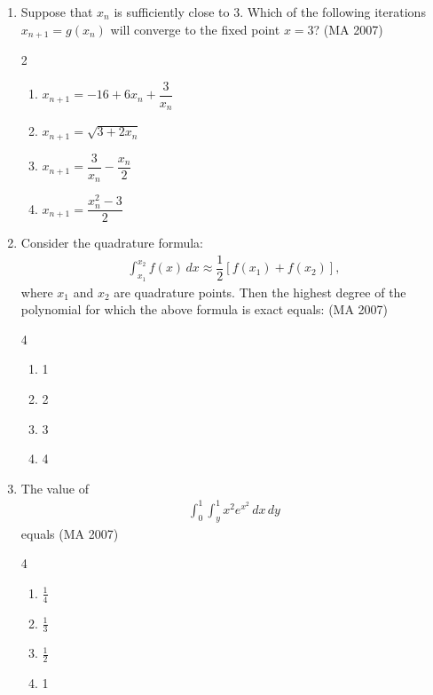 \begin{enumerate}[label=\thesubsection.\arabic*,ref=\thesubsection.\theenumi]
    is:   \hfill (MA 2007)
 \begin{multicols}{4}
\begin{enumerate}
    \item 3
    \item 4
    \item 5
    \item 6
\end{enumerate}
\end{multicols}


\item Suppose that $x_n$ is sufficiently close to 3. Which of the following iterations $x_{n+1} = g(x_n)$ will converge to the fixed point $x = 3$?
\hfill (MA 2007)
\begin{multicols}{2}
    \begin{enumerate}
        \item $x_{n+1} = -16 + 6x_n + \dfrac{3}{x_n}$
        \item $x_{n+1} = \sqrt{3 + 2x_n}$
        \item $x_{n+1} = \dfrac{3}{x_n} - \dfrac{x_n}{2}$
        \item $x_{n+1} = \dfrac{x_n^2 - 3}{2}$
    \end{enumerate}
    \end{multicols}


\item Consider the quadrature formula:
    \begin{align*}
    \int_{x_1}^{x_2} f(x)\, dx \approx \dfrac{1}{2} \left[f(x_1) + f(x_2)\right],
    \end{align*}
    where $x_1$ and $x_2$ are quadrature points. Then the highest degree of the polynomial for which the above formula is exact equals: 
    \hfill (MA 2007)
   \begin{multicols}{4}
\begin{enumerate}
    \item 1
    \item 2
    \item 3
    \item 4
\end{enumerate}
\end{multicols}
     
\item The value of 
\begin{align*}
\int_0^1 \int_y^1 x^2 e^{x^2} \, dx \, dy
\end{align*}
equals
\hfill (MA 2007)
\begin{multicols}{4}
\begin{enumerate}
    \item $\frac{1}{4}$
    \item $\frac{1}{3}$
    \item $\frac{1}{2}$
    \item 1
\end{enumerate}
\end{multicols}




\end{enumerate}

